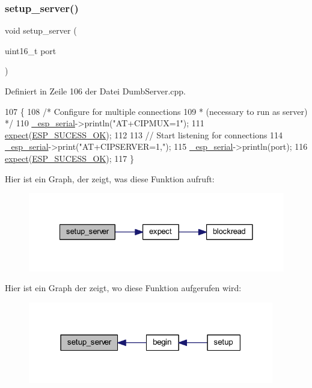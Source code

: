 \subsubsection{\texorpdfstring{setup\+\_\+server()}{setup\_server()}}
{\footnotesize\ttfamily void setup\+\_\+server (\begin{DoxyParamCaption}\item[{uint16\+\_\+t}]{port }\end{DoxyParamCaption})\hspace{0.3cm}{\ttfamily [private]}}



Definiert in Zeile 106 der Datei Dumb\+Server.\+cpp.


\begin{DoxyCode}
107 \{
108   \textcolor{comment}{/* Configure for multiple connections}
109 \textcolor{comment}{   * (necessary to run as server) */}
110   \hyperlink{class_esp_server_a552aab874ad99b696f4c997d6f5a4746}{\_esp\_serial}->println(\textcolor{stringliteral}{"AT+CIPMUX=1"});
111   \hyperlink{class_esp_server_aff5ea67ab96af075223b2b836036ccf1}{expect}(\hyperlink{_dumb_server_8cpp_a62497fcb12b1cedd5fdfbc0755508d87}{ESP\_SUCESS\_OK});
112 
113   \textcolor{comment}{// Start listening for connections}
114   \hyperlink{class_esp_server_a552aab874ad99b696f4c997d6f5a4746}{\_esp\_serial}->print(\textcolor{stringliteral}{"AT+CIPSERVER=1,"});
115   \hyperlink{class_esp_server_a552aab874ad99b696f4c997d6f5a4746}{\_esp\_serial}->println(port);
116   \hyperlink{class_esp_server_aff5ea67ab96af075223b2b836036ccf1}{expect}(\hyperlink{_dumb_server_8cpp_a62497fcb12b1cedd5fdfbc0755508d87}{ESP\_SUCESS\_OK});
117 \}
\end{DoxyCode}
Hier ist ein Graph, der zeigt, was diese Funktion aufruft\+:\nopagebreak
\begin{figure}[H]
\begin{center}
\leavevmode
\includegraphics[width=328pt]{class_esp_server_a7968cc44a6c9fff24b9020e1714c49f8_cgraph}
\end{center}
\end{figure}
Hier ist ein Graph der zeigt, wo diese Funktion aufgerufen wird\+:\nopagebreak
\begin{figure}[H]
\begin{center}
\leavevmode
\includegraphics[width=304pt]{class_esp_server_a7968cc44a6c9fff24b9020e1714c49f8_icgraph}
\end{center}
\end{figure}
